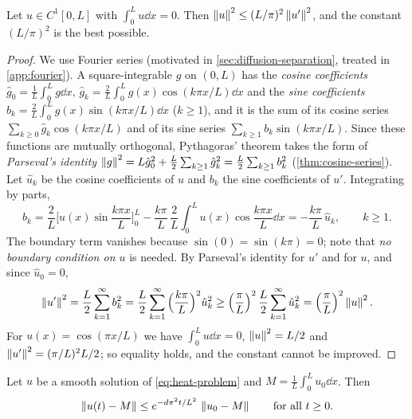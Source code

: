 \begin{lemma}\label{lem:poincare-wirtinger}
Let $u\in C^1[0,L]$ with $\int_0^Lu\dd x=0$. Then
$\left\lVert u\right\rVert^2 \le (L/\pi)^2\left\lVert u'\right\rVert^2$, and the constant $(L/\pi)^2$ is the best
possible.
\end{lemma}

\begin{proof}
We use Fourier series (motivated in \cref{sec:diffusion-separation}, treated in
\cref{app:fourier}). A square-integrable $g$ on $(0,L)$ has the \emph{cosine
coefficients} $\hat g_0=\frac1L\int_0^Lg\dd x$,
$\hat g_k=\frac2L\int_0^Lg(x)\cos(k\pi x/L)\dd x$ and the \emph{sine coefficients}
$b_k=\frac2L\int_0^Lg(x)\sin(k\pi x/L)\dd x$ ($k\ge1$), and it is the sum of its
cosine series $\sum_{k\ge0}\hat g_k\cos(k\pi x/L)$ and of its sine series
$\sum_{k\ge1}b_k\sin(k\pi x/L)$. Since these functions are mutually orthogonal,
Pythagoras' theorem takes the form of \emph{Parseval's identity}
$\left\lVert g\right\rVert^2=L\hat g_0^2+\frac L2\sum_{k\ge1}\hat g_k^2=\frac L2\sum_{k\ge1}b_k^2$
(\cref{thm:cosine-series}). Let $\hat u_k$ be the cosine coefficients of $u$ and
$b_k$ the sine coefficients of $u'$. Integrating by parts,
\begin{equation}\label{eq:diffusion-sine-coefficients}
  b_k = \frac2L\Big[u(x)\sin\frac{k\pi x}{L}\Big]_0^L
        - \frac{k\pi}{L}\,\frac2L\int_0^L u(x)\cos\frac{k\pi x}{L}\dd x
      = -\frac{k\pi}{L}\,\hat u_k ,\qquad k\ge1 .
\end{equation}
The boundary term vanishes because $\sin(0)=\sin(k\pi)=0$; note that \emph{no
boundary condition on $u$} is needed. By Parseval's identity for $u'$ and for $u$,
and since $\hat u_0=0$,
\begin{equation*}
  \left\lVert u'\right\rVert^2 = \frac L2\sum_{k=1}^\infty b_k^2
  = \frac L2\sum_{k=1}^\infty \Big(\frac{k\pi}{L}\Big)^2\hat u_k^2
  \ge \Big(\frac{\pi}{L}\Big)^2\,\frac L2\sum_{k=1}^\infty \hat u_k^2
  = \Big(\frac{\pi}{L}\Big)^2\left\lVert u\right\rVert^2 .
\end{equation*}
For $u(x)=\cos(\pi x/L)$ we have $\int_0^Lu\dd x=0$, $\left\lVert u\right\rVert^2=L/2$ and
$\left\lVert u'\right\rVert^2=(\pi/L)^2L/2$; so equality holds, and the constant cannot be improved.
\end{proof}

\begin{theorem}\label{thm:heat-decay}
Let $u$ be a smooth solution of \eqref{eq:heat-problem} and
$M=\frac1L\int_0^Lu_0\dd x$. Then
\begin{equation*}
  \left\lVert u(t)-M\right\rVert \le e^{-d\pi^2t/L^2}\,\left\lVert u_0-M\right\rVert\qquad\text{for all } t\ge0 .
\end{equation*}
\end{theorem}

